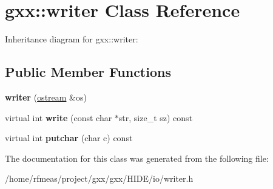 \hypertarget{classgxx_1_1writer}{}\section{gxx\+:\+:writer Class Reference}
\label{classgxx_1_1writer}


Inheritance diagram for gxx\+:\+:writer\+:
\subsection*{Public Member Functions}
\begin{DoxyCompactItemize}
\item 
{\bfseries writer} (\hyperlink{classgxx_1_1ostream}{ostream} \&os)\hypertarget{classgxx_1_1writer_a60edbdc7b75f794de2eb30adb062b4cf}{}\label{classgxx_1_1writer_a60edbdc7b75f794de2eb30adb062b4cf}

\item 
virtual int {\bfseries write} (const char $\ast$str, size\+\_\+t sz) const \hypertarget{classgxx_1_1writer_a226530dc179679e516823aaea77cecee}{}\label{classgxx_1_1writer_a226530dc179679e516823aaea77cecee}

\item 
virtual int {\bfseries putchar} (char c) const \hypertarget{classgxx_1_1writer_ae8ac28e843c0ad896041a8a512cae9dd}{}\label{classgxx_1_1writer_ae8ac28e843c0ad896041a8a512cae9dd}

\end{DoxyCompactItemize}


The documentation for this class was generated from the following file\+:\begin{DoxyCompactItemize}
\item 
/home/rfmeas/project/gxx/gxx/\+H\+I\+D\+E/io/writer.\+h\end{DoxyCompactItemize}
